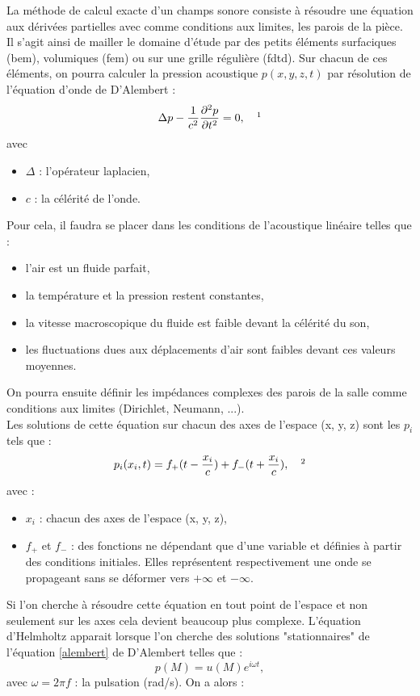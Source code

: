 La méthode de calcul exacte d'un champs sonore consiste à résoudre une équation aux dérivées partielles avec comme conditions aux limites, les parois de la pièce. Il s'agit ainsi de mailler le domaine d'étude par des petits éléments surfaciques (\gls{bem}), volumiques (\gls{fem}) ou sur une grille régulière (\gls{fdtd}). Sur chacun de ces éléments, on pourra calculer la pression acoustique $p(x,y,z,t)$ par résolution de l'équation d'onde de D'Alembert :
\begin{align} 
\Delta p-\frac{1}{c^2}\frac{\partial^2p}{\partial t^2} = 0, \ \ \ \footnotemark
\label{alembert}
\end{align}
avec
\begin{itemize}
\item $\Delta$ : l'opérateur laplacien,
\item $c$ : la célérité de l'onde.
\end{itemize}
%
Pour cela, il faudra se placer dans les conditions de l'acoustique linéaire telles que \cite[p. 19]{jot}:
%
\begin{itemize}
\item l'air est un fluide parfait,
\item la température et la pression restent constantes,
\item la vitesse macroscopique du fluide est faible devant la célérité du son,
\item les fluctuations dues aux déplacements d'air sont faibles devant ces valeurs moyennes.
\end{itemize}
%
On pourra ensuite définir les impédances complexes des parois de la salle comme conditions aux limites (\gls{Dirichlet}, \gls{Neumann}, ...). \\

Les solutions de cette équation sur chacun des axes de l'espace (x, y, z) sont les $p_i$ tels que :
\begin{equation}
p_i(x_i,t) = f_+(t-\frac{x_i}{c}) + f_-(t+\frac{x_i}{c}),
\ \ \ \footnotemark
\end{equation}
avec :
\begin{itemize}
\item $x_i$ : chacun des axes de l'espace (x, y, z),
\item $ f_+$ et  $f_-$ : des fonctions ne dépendant que d'une variable et définies à partir des conditions initiales. Elles représentent respectivement une onde se propageant sans se déformer vers $+\infty$ et $-\infty$.
\end{itemize}
Si l'on cherche à résoudre cette équation en tout point de l'espace et non seulement sur les axes cela devient beaucoup plus complexe.
L'équation d'Helmholtz apparait lorsque l'on cherche des solutions "stationnaires" de l'équation \ref{alembert} de D'Alembert telles que :
\begin{equation}
p(M) = u(M)e^{i\omega t},
\end{equation}
avec  $\omega = 2\pi f$ : la pulsation (rad/s). On a alors :

